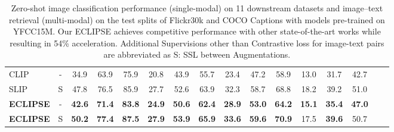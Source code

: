 \begin{table*}[t]
\begin{tabular}{lccccccccccccccc}
            \midrule
            CLIP & - & 34.9	& 63.9 & 75.9 & 20.8 & 43.9 & 55.7 & 23.4 & 47.2 & 58.9 & 13.0 & 31.7 & 42.7\\
            SLIP & S & 47.8	& 76.5 & 85.9 & 27.7 & 52.6 & 63.9 & 32.3 & 58.7 & 68.8 & 18.2 & 39.2 & 51.0\\
            \textbf{ECLIPSE} & - & \textbf{42.6} & \textbf{71.4} & \textbf{83.8} & \textbf{24.9} & \textbf{50.6} & \textbf{62.4} & \textbf{28.9} & \textbf{53.0} & \textbf{64.2} & \textbf{15.1} & \textbf{35.4} & \textbf{47.0} \\ 
            \textbf{ECLIPSE} & S & \textbf{50.2} & \textbf{77.4} & \textbf{87.5} & \textbf{27.9} & \textbf{53.9} & \textbf{65.9} & \textbf{33.6} & \textbf{59.6} & \textbf{70.9} & 17.5 & \textbf{39.6} & 50.7 \\ 
        \bottomrule
    \end{tabular}
    \caption{Zero-shot image classification performance (single-modal) on 11 downstream datasets and image--text retrieval (multi-modal) on the test splits of Flickr30k and COCO Captions with models pre-trained on YFCC15M.
    Our ECLIPSE achieves competitive performance with other state-of-the-art works while resulting in 54\% acceleration.
    Additional Supervisions other than Contrastive loss for image-text pairs are abbreviated as S: SSL between Augmentations.}
    \label{result:cls}
\end{table*}
